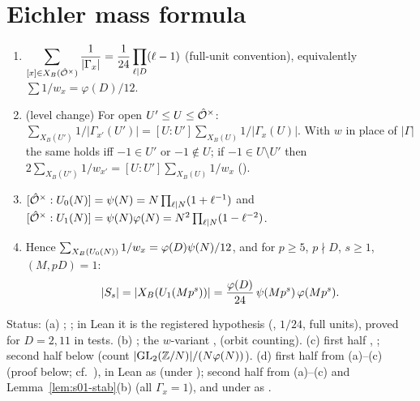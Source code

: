 \section{Eichler mass formula}

\begin{theorem}\label{thm:s01-mass}
\begin{enumerate}[label=(\alph*)]
\item $\displaystyle\sum_{[x]\in X_B(\hat{\mathcal{O}}^\times)}\frac1{|\Gamma_x|}=\frac{1}{24}\prod_{\ell\mid D}(\ell-1)$
  (full-unit convention), equivalently $\sum 1/w_x=\varphi(D)/12$.
\item (level change) For open $U'\le U\le\hat{\mathcal{O}}^\times$: $\sum_{X_B(U')}1/|\Gamma_{x'}(U')|=[U:U']\sum_{X_B(U)}1/|\Gamma_x(U)|$.
  With $w$ in place of $|\Gamma|$ the same holds iff $-1\in U'$ or $-1\notin U$; if $-1\in U\setminus U'$ then
  $2\sum_{X_B(U')}1/w_{x'}=[U:U']\sum_{X_B(U)}1/w_x$ ().
\item $[\hat{\mathcal{O}}^\times:U_0(N)]=\psi(N)=N\prod_{\ell\mid N}(1+\ell^{-1})$ and $[\hat{\mathcal{O}}^\times:U_1(N)]=\psi(N)\varphi(N)=N^2\prod_{\ell\mid N}(1-\ell^{-2})$.
\item Hence $\sum_{X_B(U_0(N))}1/w_x=\varphi(D)\psi(N)/12$, and for $p\ge5$, $p\nmid D$, $s\ge1$, $(M,pD)=1$:
\[|S_s|=|X_B(U_1(Mp^s))|=\frac{\varphi(D)}{24}\,\psi(Mp^s)\,\varphi(Mp^s).\]
\end{enumerate}
Status: (a) \stcited{} ; ;
in Lean it is the registered hypothesis  (, $1/24$, full units), proved
for $D=2,11$ in tests. (b) \stformal{}  ; the $w$-variant \stformal{} ,
 (orbit counting). (c) first half \stformal{} , ; second half
\stproved{} below (count $|\mathrm{GL}_2(\mathbb{Z}/N)|/(N\varphi(N))$). (d) first half \stpmc{} from (a)--(c) (proof below; cf.\ ), \stpmc{} in Lean as  (under ); second half \stpmc{} from (a)--(c)
and Lemma~\ref{lem:s01-stab}(b) (all $\Gamma_x=1$), and \stformal{} under  as .
\end{theorem}

